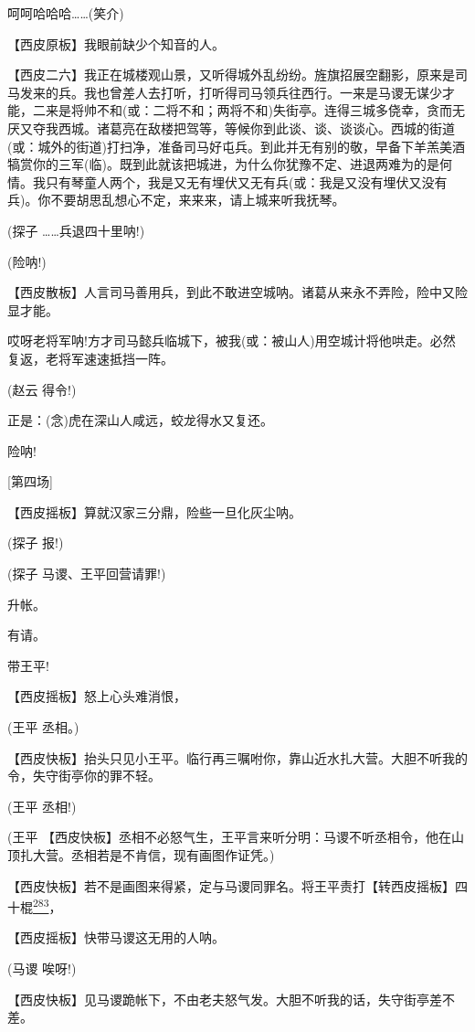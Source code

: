 呵呵哈哈哈\ldots{}\ldots{}(笑介)

【西皮原板】我眼前缺少个知音的人。

【西皮二六】我正在城楼观山景，又听得城外乱纷纷。旌旗招展空翻影，原来是司马发来的兵。我也曾差人去打听，打听得司马领兵往西行。一来是马谡无谋少才能，二来是将帅不和(或：二将不和；两将不和)失街亭。连得三城多侥幸，贪而无厌又夺我西城。诸葛亮在敌楼把驾等，等候你到此谈、谈、谈谈心。西城的街道(或：城外的街道)打扫净，准备司马好屯兵。到此并无有别的敬，早备下羊羔美酒犒赏你的三军(临)。既到此就该把城进，为什么你犹豫不定、进退两难为的是何情。我只有琴童人两个，我是又无有埋伏又无有兵(或：我是又没有埋伏又没有兵)。你不要胡思乱想心不定，来来来，请上城来听我抚琴。

(探子 \ldots{}\ldots{}兵退四十里呐!)

(险呐!)

【西皮散板】人言司马善用兵，到此不敢进空城呐。诸葛从来永不弄险，险中又险显才能。

哎呀老将军呐!方才司马懿兵临城下，被我(或：被山人)用空城计将他哄走。必然复返，老将军速速抵挡一阵。

(赵云 得令!)

正是：(念)虎在深山人咸远，蛟龙得水又复还。

险呐!

{[}第四场{]}

【西皮摇板】算就汉家三分鼎，险些一旦化灰尘呐。

(探子 报!)

(探子 马谡、王平回营请罪!)

升帐。

有请。

带王平!

【西皮摇板】怒上心头难消恨，

(王平 丞相。)

【西皮快板】抬头只见小王平。临行再三嘱咐你，靠山近水扎大营。大胆不听我的令，失守街亭你的罪不轻。

(王平 丞相!)

(王平
【西皮快板】丞相不必怒气生，王平言来听分明：马谡不听丞相令，他在山顶扎大营。丞相若是不肯信，现有画图作证凭。)

【西皮快板】若不是画图来得紧，定与马谡同罪名。将王平责打【转西皮摇板】四十棍\protect\hyperlink{fn283}{\textsuperscript{283}}，

【西皮摇板】快带马谡这无用的人呐。

(马谡 唉呀!)

【西皮快板】见马谡跪帐下，不由老夫怒气发。大胆不听我的话，失守街亭差不差。

